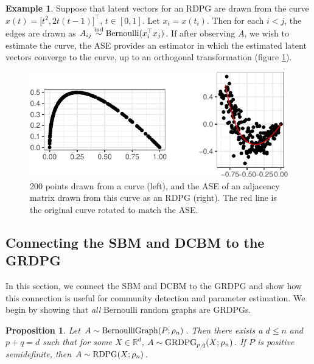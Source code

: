 \documentclass[
  12pt,
]{article}
\newtheorem{proposition}{Proposition}[section]
\theoremstyle{definition}
\theoremstyle{definition}
\newtheorem{example}{Example}[section]
\theoremstyle{definition}
\theoremstyle{definition}
\theoremstyle{remark}
\begin{document}
\begin{example}
Suppose that latent vectors for an RDPG are drawn from the curve 
$x(t) = \Big[ t^2, 2 t (t-1) \Big]^\top$, $t \in [0, 1]$. 
Let $x_i = x(t_i)$. 
Then for each $i < j$, the edges are drawn as $A_{ij} \stackrel{\mathrm{ind}}{\sim} \mathrm{Bernoulli}(x_i^\top x_j)$. 
If after observing $A$, we wish to estimate the curve, the ASE provides an estimator in which the estimated latent vectors converge to the curve, up to an orthogonal transformation (figure \ref{fig:ase-example}). 

\begin{figure}[H]

{\centering \includegraphics{draft_files/figure-latex/ase-example-1} 

}

\caption{200 points drawn from a curve (left), and the ASE of an adjacency matrix drawn from this curve as an RDPG (right). The red line is the original curve rotated to match the ASE.}\label{fig:ase-example}
\end{figure}


\end{example}

\hypertarget{sec:sbm-dcbm-grdpg}{%
\subsection{Connecting the SBM and DCBM to the GRDPG}\label{sec:sbm-dcbm-grdpg}}

In this section, we connect the SBM and DCBM to the GRDPG and show how this connection is useful for community detection and parameter estimation.
We begin by showing that \emph{all} Bernoulli random graphs are GRDPGs.

\begin{proposition}
Let $A \sim \mathrm{BernoulliGraph}(P; \rho_n)$. 
Then there exists a $d \leq n$ and $p + q = d$ such that for some $X \in \mathbb{R}^d$, $A \sim \mathrm{GRDPG}_{p, q}(X; \rho_n)$. 
If $P$ is positive semidefinite, then $A \sim \mathrm{RDPG}(X; \rho_n)$. 
\end{proposition}
\end{document}
